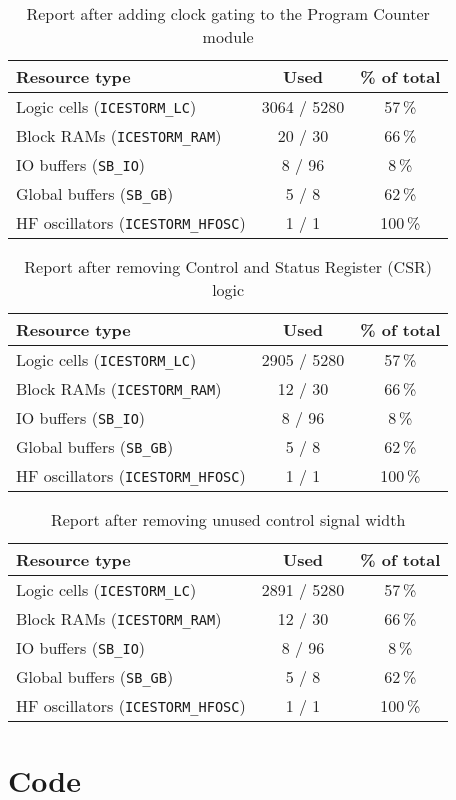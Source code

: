 \documentclass[a4paper,10pt]{article}
\begin{document}
\begin{table}[H] 
    \centering
    \begin{tabularx}{0.6\textwidth}{X c c}
        \toprule
        Resource type & Used & \% of total \\ \midrule
        Logic cells (\texttt{ICESTORM\_LC}) & 3064 / 5280 & 57\,\% \\
        Block RAMs (\texttt{ICESTORM\_RAM}) & 20 / 30 & 66\,\% \\
        IO buffers (\texttt{SB\_IO}) & 8 / 96 & 8\,\% \\
        Global buffers (\texttt{SB\_GB}) & 5 / 8 & 62\,\% \\
        HF oscillators (\texttt{ICESTORM\_HFOSC}) & 1 / 1 & 100\,\% \\
        \bottomrule
    \end{tabularx}
    \caption{Report after adding clock gating to the Program Counter module}
    \label{tab:Program_Counter}
\end{table}

\begin{table}[H] 
    \centering
    \begin{tabularx}{0.6\textwidth}{X c c}
        \toprule
        Resource type & Used & \% of total \\ \midrule
        Logic cells (\texttt{ICESTORM\_LC}) & 2905 / 5280 & 57\,\% \\
        Block RAMs (\texttt{ICESTORM\_RAM}) & 12 / 30 & 66\,\% \\
        IO buffers (\texttt{SB\_IO}) & 8 / 96 & 8\,\% \\
        Global buffers (\texttt{SB\_GB}) & 5 / 8 & 62\,\% \\
        HF oscillators (\texttt{ICESTORM\_HFOSC}) & 1 / 1 & 100\,\% \\
        \bottomrule
    \end{tabularx}
    \caption{Report after removing Control and Status Register (CSR) logic}
    \label{tab:CSR}
\end{table}

\begin{table}[H] 
    \centering
    \begin{tabularx}{0.6\textwidth}{X c c}
        \toprule
        Resource type & Used & \% of total \\ \midrule
        Logic cells (\texttt{ICESTORM\_LC}) & 2891 / 5280 & 57\,\% \\
        Block RAMs (\texttt{ICESTORM\_RAM}) & 12 / 30 & 66\,\% \\
        IO buffers (\texttt{SB\_IO}) & 8 / 96 & 8\,\% \\
        Global buffers (\texttt{SB\_GB}) & 5 / 8 & 62\,\% \\
        HF oscillators (\texttt{ICESTORM\_HFOSC}) & 1 / 1 & 100\,\% \\
        \bottomrule
    \end{tabularx}
    \caption{Report after removing unused control signal width}
    \label{tab:Signal_Width}
\end{table}

\section{Code}

%
\end{document}
